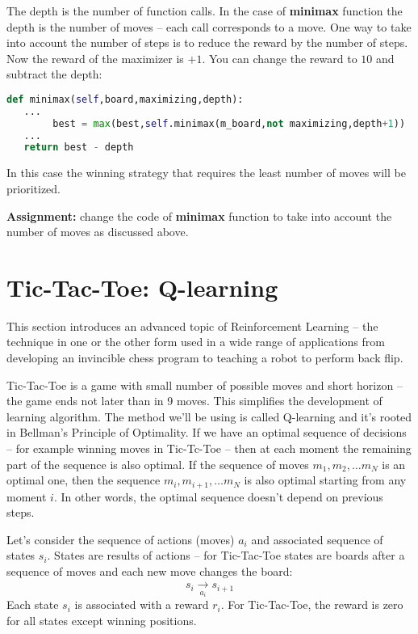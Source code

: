 The depth is the number of function calls. In the case of \textbf{minimax}
function the depth is the number of moves -- each call corresponds to a
move. One way to take into account the number of steps is to reduce 
the reward by the number of steps. Now the reward of the maximizer is $+1$.
You can change the reward to $10$ and subtract the depth:

\newpage

\begin{lstlisting}[language=Python,style=codelst2,caption={Tic-Tac-Toe: taking into accout the number of steps}]
def minimax(self,board,maximizing,depth):
   ...
        best = max(best,self.minimax(m_board,not maximizing,depth+1))
   ...
   return best - depth
\end{lstlisting}
In this case the winning strategy that requires the least number of moves 
will be prioritized. 

\begin{tcolorbox}
\textbf{Assignment:} change the code of \textbf{minimax} function to
take into account the number of moves as discussed above.
\end{tcolorbox}


\section{Tic-Tac-Toe: Q-learning}

This section introduces an advanced topic of
Reinforcement Learning -- the technique in one or the other
form used in a wide range of applications from developing
an invincible chess program to teaching a robot to perform
back flip.

Tic-Tac-Toe is a game with small number of possible moves
and short horizon -- the game ends not later than in 9 moves.
This simplifies the development of learning algorithm.
The method we'll be using is called Q-learning and it's
rooted in Bellman's Principle of Optimality. If we have an
optimal sequence of decisions -- for example winning moves
in Tic-Tc-Toe -- then at each moment the remaining part of
the sequence is also optimal. If the sequence of moves
${m_1, m_2, \dots m_N}$ is an optimal one, then
the sequence ${m_i, m_{i+1}}, \dots m_N$ is also optimal
starting from any moment $i$. In other words, the optimal sequence doesn't
depend on previous steps.

Let's consider the sequence of actions (moves) ${a_i}$ and associated
sequence of states ${s_i}$. States are results of actions --
for Tic-Tac-Toe states are boards after a sequence of moves
and each new move changes the board:
$$
s_i \xrightarrow[a_i]{} s_{i+1}
$$
Each state $s_i$ is associated with a reward $r_i$. For Tic-Tac-Toe,
the reward is zero for all states except winning positions.

